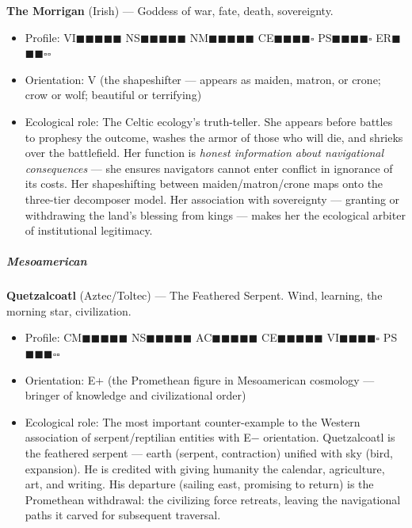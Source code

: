 \textbf{The Morrigan} (Irish) — Goddess of war, fate, death, sovereignty.

\begin{itemize}[nosep,leftmargin=*]
  \item Profile: VI$\blacksquare$$\blacksquare$$\blacksquare$$\blacksquare$$\blacksquare$ NS$\blacksquare$$\blacksquare$$\blacksquare$$\blacksquare$$\blacksquare$ NM$\blacksquare$$\blacksquare$$\blacksquare$$\blacksquare$$\blacksquare$ CE$\blacksquare$$\blacksquare$$\blacksquare$$\blacksquare$$\square$ PS$\blacksquare$$\blacksquare$$\blacksquare$$\blacksquare$$\square$ ER$\blacksquare$$\blacksquare$$\blacksquare$$\square$$\square$
  \item Orientation: V (the shapeshifter — appears as maiden, matron, or crone; crow or wolf; beautiful or terrifying)
  \item Ecological role: The Celtic ecology's truth-teller. She appears before battles to prophesy the outcome, washes the armor of those who will die, and shrieks over the battlefield. Her function is \textit{honest information about navigational consequences} — she ensures navigators cannot enter conflict in ignorance of its costs. Her shapeshifting between maiden/\allowbreak matron/\allowbreak crone maps onto the three-tier decomposer model. Her association with sovereignty — granting or withdrawing the land's blessing from kings — makes her the ecological arbiter of institutional legitimacy.
\end{itemize}


\subparagraph*{Mesoamerican}


\textbf{Quetzalcoatl} (Aztec/\allowbreak Toltec) — The Feathered Serpent. Wind, learning, the morning star, civilization.

\begin{itemize}[nosep,leftmargin=*]
  \item Profile: CM$\blacksquare$$\blacksquare$$\blacksquare$$\blacksquare$$\blacksquare$ NS$\blacksquare$$\blacksquare$$\blacksquare$$\blacksquare$$\blacksquare$ AC$\blacksquare$$\blacksquare$$\blacksquare$$\blacksquare$$\blacksquare$ CE$\blacksquare$$\blacksquare$$\blacksquare$$\blacksquare$$\blacksquare$ VI$\blacksquare$$\blacksquare$$\blacksquare$$\blacksquare$$\square$ PS$\blacksquare$$\blacksquare$$\blacksquare$$\square$$\square$
  \item Orientation: E+ (the Promethean figure in Mesoamerican cosmology — bringer of knowledge and civilizational order)
  \item Ecological role: The most important counter-example to the Western association of serpent/\allowbreak reptilian entities with E− orientation. Quetzalcoatl is the feathered serpent — earth (serpent, contraction) unified with sky (bird, expansion). He is credited with giving humanity the calendar, agriculture, art, and writing. His departure (sailing east, promising to return) is the Promethean withdrawal: the civilizing force retreats, leaving the navigational paths it carved for subsequent traversal.
\end{itemize}


